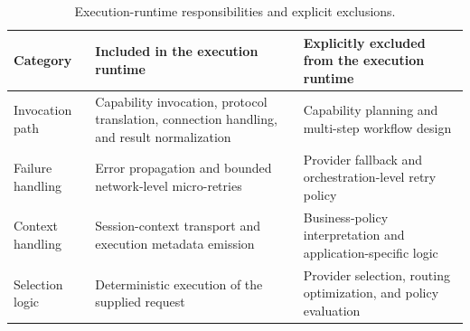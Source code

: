 \begin{table}[t]
\caption{Execution-runtime responsibilities and explicit exclusions.}
\label{tab:runtime-boundary}
\centering
\small
\begin{tabularx}{\linewidth}{@{} l X X @{}}
\toprule
Category & Included in the execution runtime & Explicitly excluded from the execution runtime \\
\midrule
Invocation path & Capability invocation, protocol translation, connection handling, and result normalization & Capability planning and multi-step workflow design \\
Failure handling & Error propagation and bounded network-level micro-retries & Provider fallback and orchestration-level retry policy \\
Context handling & Session-context transport and execution metadata emission & Business-policy interpretation and application-specific logic \\
Selection logic & Deterministic execution of the supplied request & Provider selection, routing optimization, and policy evaluation \\
\bottomrule
\end{tabularx}
\end{table}
